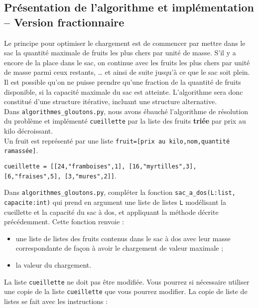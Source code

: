 \subsection*{Présentation de l’algorithme et implémentation -- Version fractionnaire}
\label{sec:PrésentationDeLAlgorithmeEtImplémentation}

Le principe pour optimiser le chargement est de commencer par mettre dans le sac la quantité maximale de fruits les plus chers par unité de masse. S'il y a encore de la place dans le sac, on continue avec les fruits les plus chers par unité de masse parmi ceux restants, … et ainsi de suite jusqu'à ce que le sac soit plein.\\
Il est possible qu'on ne puisse prendre qu'une fraction de la quantité de fruits disponible, si la capacité maximale du sac est atteinte. L'algorithme sera donc constitué d'une structure itérative, incluant une structure alternative.\\

Dans \lstinline{algorithmes_gloutons.py}, nous avons ébauché l'algorithme de résolution du problème et implémenté \lstinline{cueillette} par la liste des fruits \textbf{triée} par prix au kilo décroissant.\\
Un fruit est représenté par une liste \lstinline{fruit=[prix au kilo,nom,quantité ramassée]}.

\lstinline{cueillette = [[24,"framboises",1], [16,"myrtilles",3], [6,"fraises",5], [3,"mures",2]]}.

\begin{question}
Dans \lstinline{algorithmes_gloutons.py}, compléter la fonction \lstinline{sac_a_dos(L:list, capacite:int)} qui prend en argument une liste de listes \lstinline{L} modélisant la cueillette et la capacité du sac à dos, et appliquant la méthode décrite précédemment. Cette fonction renvoie :
\begin{itemize}
\item une liste de listes des fruits contenus dans le sac à dos avec leur masse correspondante de façon à avoir le chargement de valeur maximale ;
\item la valeur du chargement.
\end{itemize}
\end{question}

La liste \lstinline{cueillette} ne doit pas être modifiée. Vous pourrez si nécessaire utiliser une copie de la liste  \lstinline{cueillette} que vous pourrez modifier. La copie de liste de listes se fait avec les instructions :

